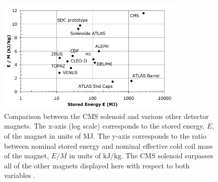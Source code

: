 \begin{figure}
  \centering
  \includegraphics[width=0.8\textwidth]{tex/cms/fig/magnet-comparison.png}
  \caption{
    Comparison between the CMS solenoid and various other detector magnets.
    The x-axis (log scale) corresponds to the stored energy, $E$, of the magnet in units of MJ.
    The y-axis corresponds to the ratio between nominal stored energy and nominal effective cold coil mass of the magnet, $E/M$
    in units of $\text{kJ}/\text{kg}$.
    The CMS solenoid surpasses all of the other magnets displayed here 
    with respect to both variables \cite{cms-jinst}.
  }
  \label{fig:solenoid-comparison}
\end{figure}

